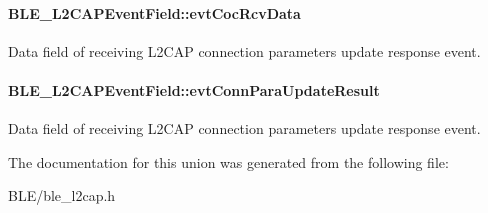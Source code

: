 \paragraph[{\texorpdfstring{evt\+Coc\+Rcv\+Data}{evtCocRcvData}}]{ B\+L\+E\+\_\+\+L2\+C\+A\+P\+Event\+Field\+::evt\+Coc\+Rcv\+Data}\hypertarget{union_b_l_e___l2_c_a_p_event_field_afee9746589a046d8be6f8af5c3b6dd8a}{}\label{union_b_l_e___l2_c_a_p_event_field_afee9746589a046d8be6f8af5c3b6dd8a}
Data field of receiving L2\+C\+AP connection parameters update response event. 
\paragraph[{\texorpdfstring{evt\+Conn\+Para\+Update\+Result}{evtConnParaUpdateResult}}]{ B\+L\+E\+\_\+\+L2\+C\+A\+P\+Event\+Field\+::evt\+Conn\+Para\+Update\+Result}\hypertarget{union_b_l_e___l2_c_a_p_event_field_a33b165aad5e120d3f9dc00a7bf76ce25}{}\label{union_b_l_e___l2_c_a_p_event_field_a33b165aad5e120d3f9dc00a7bf76ce25}
Data field of receiving L2\+C\+AP connection parameters update response event. 

The documentation for this union was generated from the following file\+:\begin{DoxyCompactItemize}
\item 
B\+L\+E/ble\+\_\+l2cap.\+h\end{DoxyCompactItemize}
